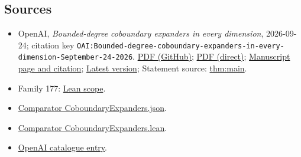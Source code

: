 \documentclass[11pt]{article}
\begin{document}
\subsection{Sources}
\begin{itemize}
\item OpenAI, \emph{Bounded-degree coboundary expanders in every dimension}, 2026-09-24; citation key \texttt{OAI:Bounded-degree-coboundary-expanders-in-every-dimension-September-24-2026}. \href{https://github.com/openai/math/blob/adc7f1241b42e322a6451854ab7e4b4c146bf78a/preprints/Bounded-degree-coboundary-expanders-in-every-dimension-September-24-2026/paper.pdf}{PDF (GitHub)}; \href{https://github.com/openai/math/raw/adc7f1241b42e322a6451854ab7e4b4c146bf78a/preprints/Bounded-degree-coboundary-expanders-in-every-dimension-September-24-2026/paper.pdf}{PDF (direct)}; \href{https://github.com/openai/math/blob/adc7f1241b42e322a6451854ab7e4b4c146bf78a/preprints/Bounded-degree-coboundary-expanders-in-every-dimension-September-24-2026/README.md}{Manuscript page and citation}; \href{https://github.com/openai/math/blob/main/preprints/Bounded-degree-coboundary-expanders-in-every-dimension-September-24-2026/paper.pdf}{Latest version}; Statement source: \href{https://github.com/openai/math/blob/adc7f1241b42e322a6451854ab7e4b4c146bf78a/preprints/Bounded-degree-coboundary-expanders-in-every-dimension-September-24-2026/build/source/sections/introduction.tex\#L40}{thm:main}.
\item Family 177: \href{https://github.com/openai/math/blob/adc7f1241b42e322a6451854ab7e4b4c146bf78a/lean/docs/177.md}{Lean scope}.
\item \href{https://github.com/openai/math/blob/adc7f1241b42e322a6451854ab7e4b4c146bf78a/lean/ComparatorChallenges/CoboundaryExpanders.json}{Comparator CoboundaryExpanders.json}.
\item \href{https://github.com/openai/math/blob/adc7f1241b42e322a6451854ab7e4b4c146bf78a/lean/ComparatorChallenges/CoboundaryExpanders.lean}{Comparator CoboundaryExpanders.lean}.
\item \href{https://github.com/openai/math/blob/adc7f1241b42e322a6451854ab7e4b4c146bf78a/CONTENTS.md}{OpenAI catalogue entry}.
\end{itemize}
\end{document}
